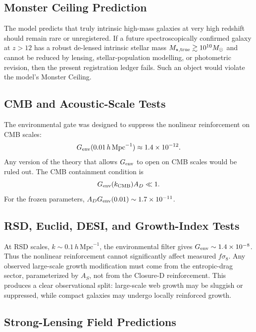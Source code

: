 \documentclass[11pt,a4paper]{article}
\newcommand{\Msun}{M_\odot}
\begin{document}
\subsection{Monster Ceiling Prediction}

The model predicts that truly intrinsic high-mass galaxies at very high redshift should remain rare or unregistered. If a future spectroscopically confirmed galaxy at $z>12$ has a robust de-lensed intrinsic stellar mass $M_{\star,\rm true}\gtrsim10^{10}\Msun$ and cannot be reduced by lensing, stellar-population modelling, or photometric revision, then the present registration ledger fails. Such an object would violate the model's Monster Ceiling.

\subsection{CMB and Acoustic-Scale Tests}

The environmental gate was designed to suppress the nonlinear reinforcement on CMB scales:
\begin{equation}
G_{\rm env}(0.01\,h\,\mathrm{Mpc}^{-1})\approx1.4\times10^{-12}.
\end{equation}
Any version of the theory that allows $G_{\rm env}$ to open on CMB scales would be ruled out. The CMB containment condition is
\begin{equation}
G_{\rm env}(k_{\rm CMB})A_D\ll1.
\end{equation}
For the frozen parameters, $A_DG_{\rm env}(0.01)\sim1.7\times10^{-11}$.

\subsection{RSD, Euclid, DESI, and Growth-Index Tests}

At RSD scales, $k\sim0.1\,h\,\mathrm{Mpc}^{-1}$, the environmental filter gives $G_{\rm env}\sim1.4\times10^{-8}$. Thus the nonlinear reinforcement cannot significantly affect measured $f\sigma_8$. Any observed large-scale growth modification must come from the entropic-drag sector, parameterized by $A_S$, not from the Closure-D reinforcement. This produces a clear observational split: large-scale web growth may be sluggish or suppressed, while compact galaxies may undergo locally reinforced growth.

\subsection{Strong-Lensing Field Predictions}
\end{document}
